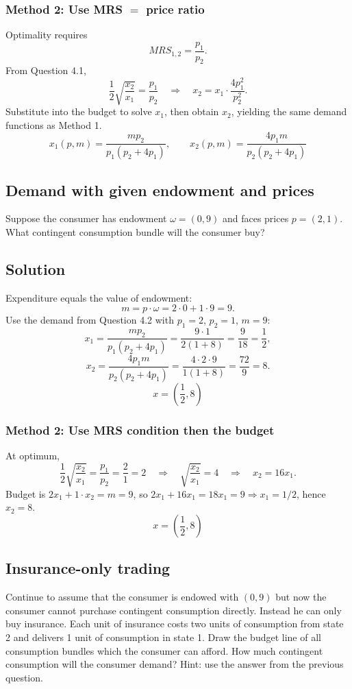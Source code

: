 \documentclass[12pt]{article}
\newcommand{\dotp}{\cdot}
\begin{document}
\subsubsection*{Method 2: Use MRS \(=\) price ratio}
Optimality requires
\[
MRS_{1,2}=\frac{p_1}{p_2}.
\]
From Question 4.1,
\[
\frac12\sqrt{\frac{x_2}{x_1}}=\frac{p_1}{p_2}
\quad\Rightarrow\quad
x_2=x_1\cdot\frac{4p_1^2}{p_2^2}.
\]
Substitute into the budget to solve \(x_1\), then obtain \(x_2\), yielding the same demand functions as Method 1.
\[
\boxed{\;x_1(p,m)=\frac{m p_2}{p_1(p_2+4p_1)},\qquad x_2(p,m)=\frac{4p_1 m}{p_2(p_2+4p_1)}\;}
\]

\subsection{Demand with given endowment and prices}
Suppose the consumer has endowment \(\omega=(0,9)\) and faces prices \(p=(2,1)\). What
contingent consumption bundle will the consumer buy?

\subsection*{Solution}
Expenditure equals the value of endowment:
\[
m=p\dotp\omega=2\cdot 0+1\cdot 9=9.
\]
Use the demand from Question 4.2 with \(p_1=2\), \(p_2=1\), \(m=9\):
\[
x_1=\frac{m p_2}{p_1(p_2+4p_1)}=\frac{9\cdot 1}{2(1+8)}=\frac{9}{18}=\frac12,
\]
\[
x_2=\frac{4p_1 m}{p_2(p_2+4p_1)}=\frac{4\cdot 2\cdot 9}{1(1+8)}=\frac{72}{9}=8.
\]
\[
\boxed{\;x=\left(\frac12,8\right)\;}
\]

\subsubsection*{Method 2: Use MRS condition then the budget}
At optimum,
\[
\frac12\sqrt{\frac{x_2}{x_1}}=\frac{p_1}{p_2}=\frac{2}{1}=2
\quad\Rightarrow\quad
\sqrt{\frac{x_2}{x_1}}=4
\quad\Rightarrow\quad
x_2=16x_1.
\]
Budget is \(2x_1+1\cdot x_2=m=9\), so \(2x_1+16x_1=18x_1=9\Rightarrow x_1=1/2\), hence \(x_2=8\).
\[
\boxed{\;x=\left(\frac12,8\right)\;}
\]

\subsection{Insurance-only trading}
Continue to assume that the consumer is endowed with \((0,9)\) but now the consumer
cannot purchase contingent consumption directly. Instead he can only buy insurance.
Each unit of insurance costs two units of consumption from state 2 and delivers 1 unit
of consumption in state 1. Draw the budget line of all consumption bundles which the
consumer can afford. How much contingent consumption will the consumer demand?
Hint: use the answer from the previous question.
\end{document}
